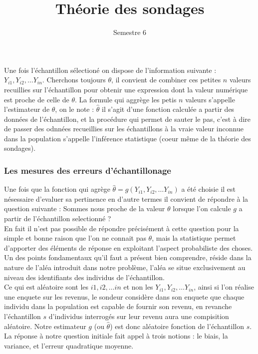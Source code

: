 \documentclass[a4paper]{article}
\title{Théorie des sondages}
\date{Semestre 6}
\begin{document}
\maketitle
\tableofcontents

\part{}

\section{}
Une fois l'échantillon sélectioné on dispose de l'information suivante :\\ $Y_{i1}, Y_{i2}, \ldots Y_{in}$. Cherchons toujours $\theta$, il convient de 
combiner ces petites $n$ valeurs recuillies sur l'échantillon pour obtenir une expression dont la valeur numérique est proche de celle de $\theta$. La 
formule qui aggrège les petis $n$ valeurs s'appelle l'estimateur de $\theta$, on le note :  $\hat{\theta}$ il s'agit d'une fonction calculée a partir 
des données de l'échantillon, et la procédure qui permet de sauter le pas, c'est à dire de passer des odnnées recueillies sur les échantillons à la
vraie valeur inconnue dans la population s'appelle l'inférence statistique (coeur même de la théorie des sondages).

\section{Les mesures des erreurs d'échantillonage}
Une fois que la fonction qui agrège $\hat{\theta} = g(Y_{i1}, Y_{i2}, \ldots Y_{in})$ a été choisie il est nésessaire d'evaluer sa pertinence en
d'autre termes il convient de répondre à la question suivante : Sommes nous proche de la valeur $\theta$ lorsque l'on calcule $g$ a partir de
l'échantillon selectionné ?\\
En fait il n'est pas possible de répondre précisément à cette question pour la simple et bonne raison que l'on ne connait
pas $\theta$, mais la statistique permet d'apporter des éléments de réponse en exploitant l'aspect probabiliste des choses. Un des points fondamentaux
qu'il faut a présent bien comprendre, réside dans la nature de l'aléa introduit dans notre problème, l'aléa se situe exclusivement au niveau des
identifiants des individus de l'échantillon. \\

Ce qui est aléatoire sont les $i1, i2, \ldots in$ et non les $ Y_{i1}, Y_{i2}, \ldots Y_{in}$, ainsi si l'on réalise une enquete sur les revenus, le
sondeur considère dans son enquete que chaque individu dans la population est capable de fournir son revenu, en revanche l'échantillon $s$ d'individus
interrogés sur leur revenu aura une compisition aléatoire. Notre estimateur  $g$ (ou $\hat{\theta}$) est donc aléatoire fonction de l'échantillon $s$. La
réponse à notre question initiale fait appel à trois notions : le biais, la variance, et l'erreur quadratique moyenne. 
\end{document}
